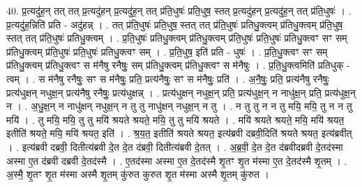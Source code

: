 \documentclass[17pt]{extarticle}
\begin{document}
40. प्र॒त्यदु॑ह॒न् तत् तत् प्र॒त्यदु॑हन् प्र॒त्यदु॑ह॒न् तत् प्र॑ति॒धुषः॑ प्रति॒धुष॒ स्तत् प्र॒त्यदु॑हन् प्र॒त्यदु॑ह॒न् तत् प्र॑ति॒धुषः॑ । . प्र॒त्यदु॑ह॒न्निति॑ प्रति - अदु॑हन्न् । . तत् प्र॑ति॒धुषः॑ प्रति॒धुष॒ स्तत् तत् प्र॑ति॒धुषः॑ प्रतिधु॒क्त्वम् प्र॑तिधु॒क्त्वम् प्र॑ति॒धुष॒ स्तत् तत् प्र॑ति॒धुषः॑ प्रतिधु॒क्त्वम् । . प्र॒ति॒धुषः॑ प्रतिधु॒क्त्वम् प्र॑तिधु॒क्त्वम् प्र॑ति॒धुषः॑ प्रति॒धुषः॑ प्रतिधु॒क्त्वꣳ सꣳ सम् प्र॑तिधु॒क्त्वम् प्र॑ति॒धुषः॑ प्रति॒धुषः॑ प्रतिधु॒क्त्वꣳ सम् । . प्र॒ति॒धुष॒ इति॑ प्रति - धुषः॑ । . प्र॒ति॒धु॒क्त्वꣳ सꣳ सम् प्र॑तिधु॒क्त्वम् प्र॑तिधु॒क्त्वꣳ स म॑नैषु रनैषुः॒ सम् प्र॑तिधु॒क्त्वम् प्र॑तिधु॒क्त्वꣳ स म॑नैषुः । . प्र॒ति॒धु॒क्त्वमिति॑ प्रतिधुक् - त्वम् । . स म॑नैषु रनैषुः॒ सꣳ स म॑नैषुः॒ प्रति॒ प्रत्य॑नैषुः॒ सꣳ स म॑नैषुः॒ प्रति॑ । . अ॒नै॒षुः॒ प्रति॒ प्रत्य॑नैषु रनैषुः॒ प्रत्य॑धुक्षन् नधुक्ष॒न् प्रत्य॑नैषु रनैषुः॒ प्रत्य॑धुक्षन्न् । . प्रत्य॑धुक्षन् नधुक्ष॒न् प्रति॒ प्रत्य॑धुक्ष॒न् न नाधु॑क्ष॒न् प्रति॒ प्रत्य॑धुक्ष॒न् न । . अ॒धु॒क्ष॒न् न नाधु॑क्षन् नधुक्ष॒न् न तु तु नाधु॑क्षन् नधुक्ष॒न् न तु । . न तु तु न न तु मयि॒ मयि॒ तु न न तु मयि॑ । . तु मयि॒ मयि॒ तु तु मयि॑ श्रयते श्रयते॒ मयि॒ तु तु मयि॑ श्रयते । . मयि॑ श्रयते श्रयते॒ मयि॒ मयि॑ श्रयत॒ इतीति॑ श्रयते॒ मयि॒ मयि॑ श्रयत॒ इति॑ । . श्र॒य॒त॒ इतीति॑ श्रयते श्रयत॒ इत्य॑ब्रवी दब्रवी॒दिति॑ श्रयते श्रयत॒ इत्य॑ब्रवीत् । . इत्य॑ब्रवी दब्रवी॒ दितीत्य॑ब्रवी दे॒त दे॒त द॑ब्रवी॒ दितीत्य॑ब्रवी दे॒तत् । . अ॒ब्र॒वी॒ दे॒त दे॒त द॑ब्रवीदब्रवी दे॒तद॑स्मा अस्मा ए॒त द॑ब्रवी दब्रवी दे॒तद॑स्मै । . ए॒तद॑स्मा अस्मा ए॒त दे॒तद॑स्मै शृ॒तꣳ शृ॒त म॑स्मा ए॒त दे॒तद॑स्मै शृ॒तम् । . अ॒स्मै॒ शृ॒तꣳ शृ॒त म॑स्मा अस्मै शृ॒तम् कु॑रुत कुरुत शृ॒त म॑स्मा अस्मै शृ॒तम् कु॑रुत । \newline
\pagebreak
{}
\end{document}
